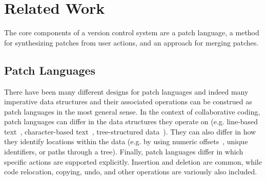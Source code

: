 
\section{Related Work}%
\label{sec:Related Work}

The core components of a version control system are a patch language, a method for synthesizing patches from user actions, and an approach for merging patches. 




\subsection{Patch Languages}
There have been many different designs for patch languages and indeed many imperative data structures and their associated operations can be construed as patch languages in the most general sense. In the context of collaborative coding, patch languages can differ in the data structures they operate on (e.g. line-based text~\cite{DBLP:conf/haskell/Roundy05}, character-based text~\cite{DBLP:conf/sigmod/EllisG89,DBLP:journals/pacmhci/LittLKH22}, tree-structured data~\cite{DBLP:conf/esa/Klein98}). 
They can also differ in how they identify locations within the data (e.g. by using numeric offsets~\cite{DBLP:conf/sigmod/EllisG89}, unique identifiers, or paths through a tree).
Finally, patch languages differ in which specific actions are supported explicitly. Insertion and deletion are common, while code relocation, copying, undo, and other operations are variously also included.

